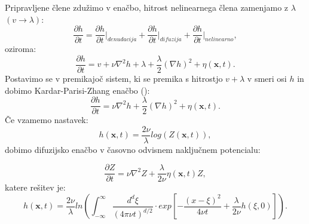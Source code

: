 \documentclass[a4paper, twoside, 12pt]{book}
\begin{document}

Pripravljene člene zdužimo v enačbo, hitrost nelinearnega člena zamenjamo z $\lambda$ $(v \rightarrow \lambda)$:
\begin{equation}
  \frac{\partial h}{\partial t} = \frac{\partial h}{\partial t} \bigg|_{denudacija} + \frac{\partial h}{\partial t} \bigg|_{difuzija} + \frac{\partial h}{\partial t} \bigg|_{nelinearno},
  \label{KPZ1}
\end{equation}
oziroma:
\begin{equation}
  \frac{\partial h}{\partial t} = v + \nu \nabla^2 h + \lambda + \frac{\lambda}{2} (\nabla h)^2 + \eta (\mathbf{x},t).
  \label{KPZ2}
\end{equation}
Postavimo se v premikajoč sistem, ki se premika s hitrostjo $v + \lambda$ v smeri osi $h$ in dobimo Kardar-Parisi-Zhang enačbo (\cite{kardar1986dynamic}):
\begin{equation}
  \frac{\partial h}{\partial t} = \nu \nabla^2 h + \frac{\lambda}{2} (\nabla h)^2 + \eta (\mathbf{x},t).
  \label{KPZ}
\end{equation}
Če vzamemo nastavek:
\begin{equation}
  h(\mathbf{x},t) = \frac{2 \nu}{\lambda} log(Z(\mathbf{x},t)),
\end{equation}
dobimo difuzijsko enačbo v časovno odvisnem naključnem potencialu:

\begin{equation}
  \frac{\partial Z}{\partial t} = \nu \nabla^2 Z + \frac{\lambda}{2 \nu} \eta(\mathbf{x},t) Z,
\end{equation}
katere rešitev je:
\begin{equation}
  h(\mathbf{x},t) = \frac{2 \nu}{\lambda} ln \left( \int_{-\infty}^{\infty} \frac{d^d \xi}{(4 \pi \nu t)^{d/2}} \cdot exp \left[-\frac{(x-\xi)^2}{4 \nu t} + \frac{\lambda}{2 \nu}h(\xi,0) \right] \right).
\end{equation}
\end{document}
